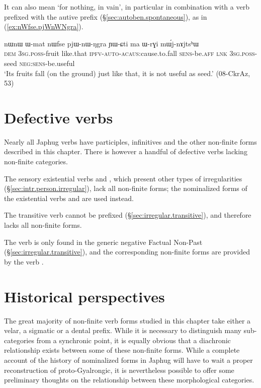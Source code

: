 It can also mean `for nothing, in vain', in particular in combination with a verb prefixed with the autive prefix (§\ref{sec:autoben.spontaneous}),  as in (\ref{ex:nWfse.pjWnWNgra}).

\begin{exe}
\ex \label{ex:nWfse.pjWnWNgra}
\gll nɯnɯ ɯ-mat nɯfse pjɯ-nɯ-ŋgra ɲɯ-ɕti ma ɯ-rɣi mɯ́j-nɤjtsʰɯ \\
\textsc{dem} \textsc{3sg}.\textsc{poss}-fruit like.that \textsc{ipfv}-\textsc{auto}-\textsc{acaus}:cause.to.fall \textsc{sens}-be.\textsc{aff} \textsc{lnk} \textsc{3sg}.\textsc{poss}-seed \textsc{neg}:\textsc{sens}-be.useful \\
\glt `Its fruits fall (on the ground) just like that, it is not useful as seed.' (08-CkrAz, 53)
\end{exe}  


\section{Defective verbs} \label{sec:nmlz.defective}
Nearly all Japhug verbs have participles, infinitives and the other non-finite forms described in this chapter. There is however a handful of defective verbs lacking non-finite categories. 

The sensory existential verbs  and , which present other types of irregularities (§\ref{sec:intr.person.irregular}), lack all non-finite forms; the nominalized forms of the existential verbs  and  are used instead.

The transitive verb  cannot be prefixed (§\ref{sec:irregular.transitive}), and therefore lacks all non-finite forms.

The verb  is only found in the generic negative Factual Non-Past (§\ref{sec:irregular.transitive}), and the corresponding non-finite forms are provided by the verb .

\section{Historical perspectives} \label{sec:nmlz.historical.perspectives}
The great majority of non-finite verb forms studied in this chapter take either a velar, a sigmatic or a dental prefix. While it is necessary to distinguish many sub-categories from a synchronic point, it is equally obvious that a diachronic relationship exists between some of these non-finite forms. While a complete account of the history of nominalized forms in Japhug will have to wait a proper reconstruction of proto-Gyalrongic, it is nevertheless possible to offer some preliminary thoughts on the relationship between these morphological categories.

